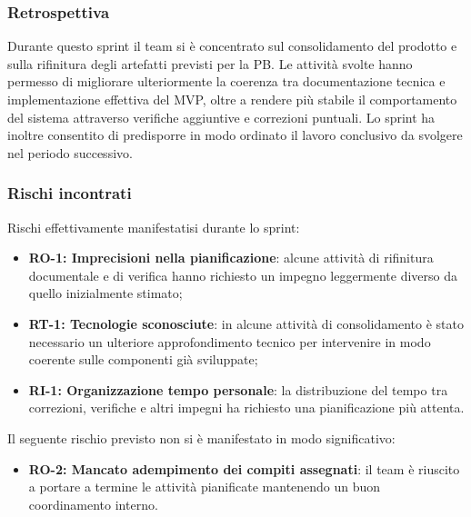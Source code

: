 \documentclass[a4paper,12pt]{article}
\begin{document}
 \subsubsection{Retrospettiva}{
        Durante questo sprint il team si è concentrato sul consolidamento del prodotto e sulla rifinitura degli artefatti previsti per la PB. Le attività svolte hanno permesso di migliorare ulteriormente la coerenza tra documentazione tecnica e implementazione effettiva del MVP, oltre a rendere più stabile il comportamento del sistema attraverso verifiche aggiuntive e correzioni puntuali. Lo sprint ha inoltre consentito di predisporre in modo ordinato il lavoro conclusivo da svolgere nel periodo successivo.
    }

    \subsubsection{Rischi incontrati}{
        Rischi effettivamente manifestatisi durante lo sprint:
        \begin{itemize}
            \item \textbf{RO-1: Imprecisioni nella pianificazione}: alcune attività di rifinitura documentale e di verifica hanno richiesto un impegno leggermente diverso da quello inizialmente stimato;
            \item \textbf{RT-1: Tecnologie sconosciute}: in alcune attività di consolidamento è stato necessario un ulteriore approfondimento tecnico per intervenire in modo coerente sulle componenti già sviluppate;
            \item \textbf{RI-1: Organizzazione tempo personale}: la distribuzione del tempo tra correzioni, verifiche e altri impegni ha richiesto una pianificazione più attenta.
        \end{itemize}

        Il seguente rischio previsto non si è manifestato in modo significativo:
        \begin{itemize}
            \item \textbf{RO-2: Mancato adempimento dei compiti assegnati}: il team è riuscito a portare a termine le attività pianificate mantenendo un buon coordinamento interno.
        \end{itemize}
    }
\end{document}
